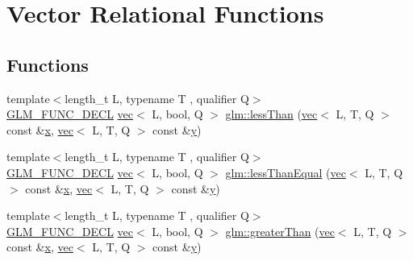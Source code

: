 \hypertarget{group__core__func__vector__relational}{}\section{Vector Relational Functions}
\label{group__core__func__vector__relational}
\subsection*{Functions}
\begin{DoxyCompactItemize}
\item 
{\footnotesize template$<$length\+\_\+t L, typename T , qualifier Q$>$ }\\\hyperlink{setup_8hpp_ab2d052de21a70539923e9bcbf6e83a51}{G\+L\+M\+\_\+\+F\+U\+N\+C\+\_\+\+D\+E\+CL} \hyperlink{structglm_1_1vec}{vec}$<$ L, bool, Q $>$ \hyperlink{group__core__func__vector__relational_ga314be073c42278ccb6fe7a7958213824}{glm\+::less\+Than} (\hyperlink{structglm_1_1vec}{vec}$<$ L, T, Q $>$ const \&\hyperlink{_s_d_l__opengl_8h_ad0e63d0edcdbd3d79554076bf309fd47}{x}, \hyperlink{structglm_1_1vec}{vec}$<$ L, T, Q $>$ const \&\hyperlink{_s_d_l__opengl_8h_a1675d9d7bb68e1657ff028643b4037e3}{y})
\item 
{\footnotesize template$<$length\+\_\+t L, typename T , qualifier Q$>$ }\\\hyperlink{setup_8hpp_ab2d052de21a70539923e9bcbf6e83a51}{G\+L\+M\+\_\+\+F\+U\+N\+C\+\_\+\+D\+E\+CL} \hyperlink{structglm_1_1vec}{vec}$<$ L, bool, Q $>$ \hyperlink{group__core__func__vector__relational_ga51bf75522dbe1fa5e7806eb9b825ab6a}{glm\+::less\+Than\+Equal} (\hyperlink{structglm_1_1vec}{vec}$<$ L, T, Q $>$ const \&\hyperlink{_s_d_l__opengl_8h_ad0e63d0edcdbd3d79554076bf309fd47}{x}, \hyperlink{structglm_1_1vec}{vec}$<$ L, T, Q $>$ const \&\hyperlink{_s_d_l__opengl_8h_a1675d9d7bb68e1657ff028643b4037e3}{y})
\item 
{\footnotesize template$<$length\+\_\+t L, typename T , qualifier Q$>$ }\\\hyperlink{setup_8hpp_ab2d052de21a70539923e9bcbf6e83a51}{G\+L\+M\+\_\+\+F\+U\+N\+C\+\_\+\+D\+E\+CL} \hyperlink{structglm_1_1vec}{vec}$<$ L, bool, Q $>$ \hyperlink{group__core__func__vector__relational_gad3a3a7d228da3754c328c9a778f6df56}{glm\+::greater\+Than} (\hyperlink{structglm_1_1vec}{vec}$<$ L, T, Q $>$ const \&\hyperlink{_s_d_l__opengl_8h_ad0e63d0edcdbd3d79554076bf309fd47}{x}, \hyperlink{structglm_1_1vec}{vec}$<$ L, T, Q $>$ const \&\hyperlink{_s_d_l__opengl_8h_a1675d9d7bb68e1657ff028643b4037e3}{y})

\end{DoxyCompactItemize}
